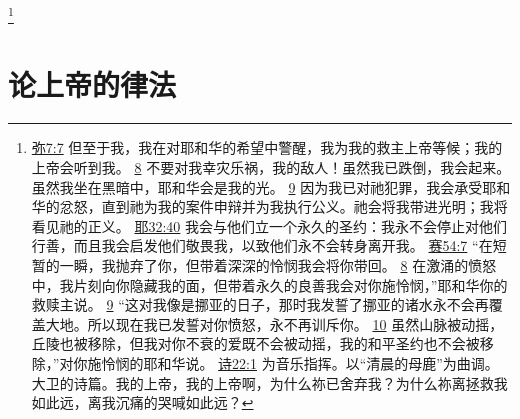 \documentclass[12pt, a4paper, oneside]{ctexart}
\begin{document}
	\footnote {
		\href{https://biblehub.com/micah/7-7.htm}{弥7:7} 但至于我，我在对耶和华的希望中警醒，我为我的救主上帝等候；我的上帝会听到我。
		\href{https://biblehub.com/micah/7-8.htm}{8} 不要对我幸灾乐祸，我的敌人！虽然我已跌倒，我会起来。虽然我坐在黑暗中，耶和华会是我的光。
		\href{https://biblehub.com/micah/7-9.htm}{9} 因为我已对祂犯罪，我会承受耶和华的忿怒，直到祂为我的案件申辩并为我执行公义。祂会将我带进光明；我将看见祂的正义。
		\href{https://biblehub.com/jeremiah/32-40.htm}{耶32:40} 我会与他们立一个永久的圣约：我永不会停止对他们行善，而且我会启发他们敬畏我，以致他们永不会转身离开我。
		\href{https://biblehub.com/isaiah/54-7.htm}{赛54:7} “在短暂的一瞬，我抛弃了你，但带着深深的怜悯我会将你带回。
		\href{https://biblehub.com/isaiah/54-8.htm}{8} 在激涌的愤怒中，我片刻向你隐藏我的面，但带着永久的良善我会对你施怜悯，”耶和华你的救赎主说。
		\href{https://biblehub.com/isaiah/54-9.htm}{9} “这对我像是挪亚的日子，那时我发誓了挪亚的诸水永不会再覆盖大地。所以现在我已发誓对你愤怒，永不再训斥你。
		\href{https://biblehub.com/isaiah/54-10.htm}{10} 虽然山脉被动摇，丘陵也被移除，但我对你不衰的爱既不会被动摇，我的和平圣约也不会被移除，”对你施怜悯的耶和华说。
		\href{https://biblehub.com/psalms/22-1.htm}{诗22:1} 为音乐指挥。以“清晨的母鹿”为曲调。大卫的诗篇。我的上帝，我的上帝啊，为什么祢已舍弃我？为什么祢离拯救我如此远，离我沉痛的哭喊如此远？
	}

\section{论上帝的律法}
\end{document}
